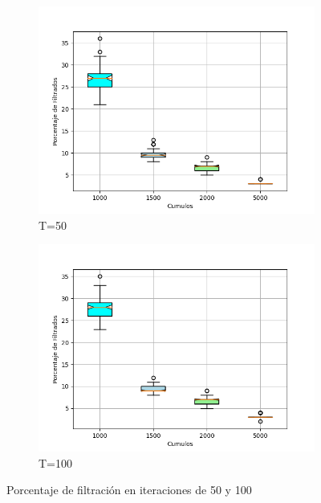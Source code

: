 \documentclass{article}
\begin{document}
\begin{figure}[H]
       \centering
        \begin{subfigure}[b]{0.90\linewidth}
            \includegraphics[width=\linewidth]{cumulos50.png}
            \caption{T=50}	
            \label{f2.a}
        \end{subfigure}
\begin{subfigure}[b]{0.90\linewidth}
            \includegraphics[width=\linewidth]{cumulos1000.png}
            \caption{T=100}
            \label{f2.b}
        \end{subfigure}
\caption{Porcentaje de filtraci\'on en iteraciones de 50 y 100}
        \label{f2}
\end{figure}
\end{document}
